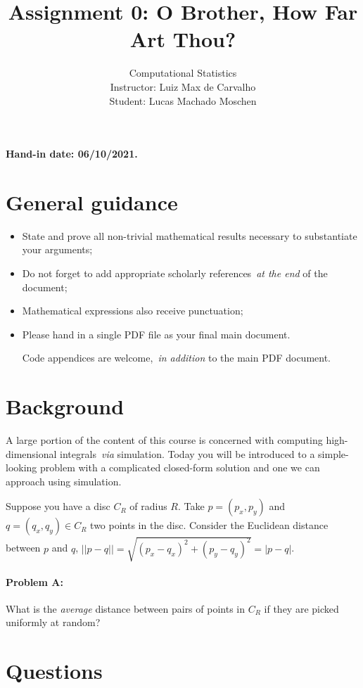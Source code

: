 \documentclass[a4paper,10pt, notitlepage]{report}
\title{Assignment 0: O Brother, How Far Art Thou?}
\author{Computational Statistics \\ Instructor: Luiz Max de Carvalho \\ Student: Lucas Machado Moschen}
\begin{document}
\maketitle

\textbf{Hand-in date: 06/10/2021.}

\section*{General guidance}
\begin{itemize}
 \item State and prove all non-trivial mathematical results necessary to substantiate your arguments;
 \item Do not forget to add appropriate scholarly references~\textit{at the end} of the document;
 \item Mathematical expressions also receive punctuation;
 \item Please hand in a single PDF file as your final main document.
 
 Code appendices are welcome,~\textit{in addition} to the main PDF document.
 \end{itemize}

\newpage

\section*{Background}

A large portion of the content of this course is concerned with computing high-dimensional integrals~\textit{via} simulation.
Today you will be introduced to a simple-looking problem with a complicated closed-form solution and one we can approach using simulation.

Suppose you have a disc $C_R$ of radius $R$. 
Take $p = (p_x, p_y)$ and $ q = (q_x, q_y) \in C_R$ two points in the disc.  
Consider the Euclidean distance between $p$  and $q$, $||p-q|| = \sqrt{(p_x-q_x)^2 + (p_y-q_y)^2} = |p-q|$.
\paragraph{Problem A:} What is the \textit{average} distance between pairs of points in $C_R$ if they are picked uniformly at random?

\section*{Questions}
\end{document}
